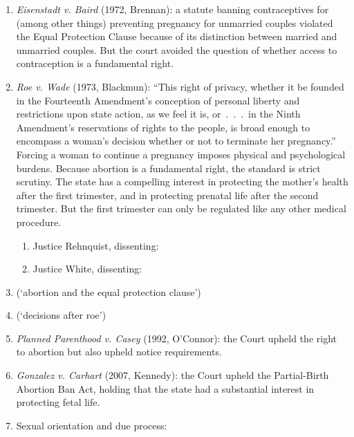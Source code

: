 \begin{enumerate}
\begin{enumerate}
        illicit relationships)---but it's not.
        \item Black, dissenting: there is no fundamental constitutional right 
        to privacy. The Court cannot reliably discern ``fundamental principles 
        of liberty and justice.''\footnote{Casebook p. 1351.}
    \end{enumerate}
    \item \emph{Eisenstadt v. Baird} (1972, Brennan): a statute banning 
    contraceptives for (among other things) preventing pregnancy for unmarried 
    couples violated the Equal Protection Clause because of its distinction 
    between married and unmarried couples. But the court avoided the question 
    of whether access to contraception is a fundamental right.
    \item \emph{Roe v. Wade} (1973, Blackmun): ``This right of privacy, 
    whether it be founded in the Fourteenth Amendment's conception of personal 
    liberty and restrictions upon state action, as we feel it is, or~.~.~.~in 
    the Ninth Amendment's reservations of rights to the people, is broad 
    enough to encompass a woman's decision whether or not to terminate her 
    pregnancy.'' Forcing a woman to continue a pregnancy imposes physical and 
    psychological burdens. Because abortion is a fundamental right, the 
    standard is strict scrutiny. The state has a compelling interest in 
    protecting the mother's health after the first trimester, and in 
    protecting prenatal life after the second trimester. But the first 
    trimester can only be regulated like any other medical procedure.
    \begin{enumerate}
        \item Justice Rehnquist, dissenting: %
        \item Justice White, dissenting: %
    \end{enumerate}
    \item (`abortion and the equal protection clause') %
    \item (`decisions after roe') %
    \item \emph{Planned Parenthood v. Casey} (1992, O'Connor): the Court 
    upheld the right to abortion but also upheld notice requirements.
    \item \emph{Gonzalez v. Carhart} (2007, Kennedy): the Court upheld the 
    Partial-Birth Abortion Ban Act, holding that the state had a substantial 
    interest in protecting fetal life.
    \item Sexual orientation and due process:

\end{enumerate}
